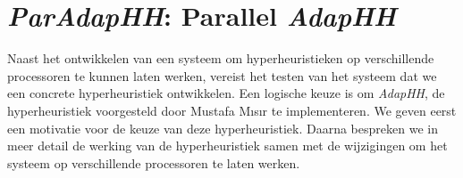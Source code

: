 \chapter{\emph{ParAdapHH}: Parallel \emph{AdapHH}}

Naast het ontwikkelen van een systeem om hyperheuristieken op verschillende processoren te kunnen laten werken, vereist het testen van het systeem dat we een concrete hyperheuristiek ontwikkelen. Een logische keuze is om \emph{AdapHH}, de hyperheuristiek voorgesteld door Mustafa M\i{}s\i{}r te implementeren. We geven eerst een motivatie voor de keuze van deze hyperheuristiek. Daarna bespreken we in meer detail de werking van de hyperheuristiek samen met de wijzigingen om het systeem op verschillende processoren te laten werken.













